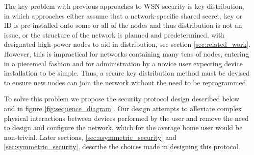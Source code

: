 \documentclass{mpaper}
\begin{document}
The key problem with previous approaches to WSN security is key distribution, in which approaches either assume that a network-specific shared secret, key or ID is pre-installed onto some or all of the nodes and thus distribution is not an issue, or the structure of the network is planned and predetermined, with designated high-power nodes to aid in distribution, see section \ref{sec:related_work}. However, this is impractical for networks containing many tens of nodes, entering in a piecemeal fashion and for administration by a novice user expecting device installation to be simple. Thus, a secure key distribution method must be devised to ensure new nodes can join the network without the need to be reprogrammed.

To solve this problem we propose the security protocol design described below and in figure \ref{fig:sequence_diagram}. Our design attempts to alleviate complex physical interactions between devices performed by the user\cite{MessageBottle} and remove the need to design and configure the network, which for the average home user would be non-trivial. Later sections, \ref{sec:asymmetric_security} and \ref{sec:symmetric_security}, describe the choices made in designing this protocol.
\end{document}
